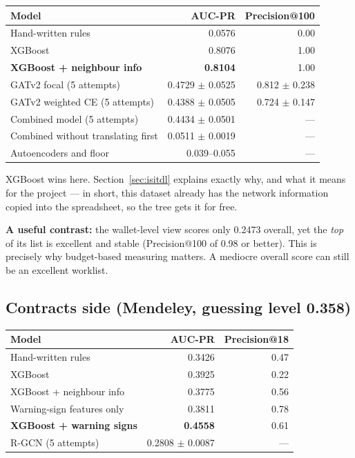 \documentclass[11pt,a4paper]{article}
\begin{document}
\begin{center}\small
\begin{tabular}{@{}lrr@{}}
\toprule
\textbf{Model} & \textbf{AUC-PR} & \textbf{Precision@100} \\
\midrule
Hand-written rules & 0.0576 & 0.00 \\
XGBoost & 0.8076 & 1.00 \\
\textbf{XGBoost + neighbour info} & \textbf{0.8104} & 1.00 \\
GATv2 focal (5 attempts) & 0.4729 $\pm$ 0.0525 & 0.812 $\pm$ 0.238 \\
GATv2 weighted CE (5 attempts) & 0.4388 $\pm$ 0.0505 & 0.724 $\pm$ 0.147 \\
Combined model (5 attempts) & 0.4434 $\pm$ 0.0501 & --- \\
Combined without translating first & 0.0511 $\pm$ 0.0019 & --- \\
Autoencoders and floor & 0.039--0.055 & --- \\
\bottomrule
\end{tabular}
\end{center}

XGBoost wins here. Section~\ref{sec:isitdl} explains exactly why, and what it
means for the project --- in short, this dataset already has the network
information copied into the spreadsheet, so the tree gets it for free.

\textbf{A useful contrast:} the wallet-level view scores only 0.2473 overall, yet
the \emph{top} of its list is excellent and stable (Precision@100 of 0.98 or
better). This is precisely why budget-based measuring matters. A mediocre overall
score can still be an excellent worklist.

\subsection{Contracts side (Mendeley, guessing level 0.358)}

\begin{center}\small
\begin{tabular}{@{}lrr@{}}
\toprule
\textbf{Model} & \textbf{AUC-PR} & \textbf{Precision@18} \\
\midrule
Hand-written rules & 0.3426 & 0.47 \\
XGBoost & 0.3925 & 0.22 \\
XGBoost + neighbour info & 0.3775 & 0.56 \\
Warning-sign features only & 0.3811 & 0.78 \\
\textbf{XGBoost + warning signs} & \textbf{0.4558} & 0.61 \\
R-GCN (5 attempts) & 0.2808 $\pm$ 0.0087 & --- \\
\bottomrule
\end{tabular}
\end{center}
\end{document}
